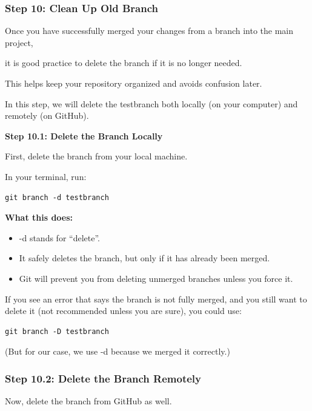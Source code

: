 \documentclass[
  11pt,
  a4paper,
]{article}
\begin{document}
\newpage

\subsubsection{Step 10: Clean Up Old
Branch}\label{step-10-clean-up-old-branch}

Once you have successfully merged your changes from a branch into the
main project,

it is good practice to delete the branch if it is no longer needed.

This helps keep your repository organized and avoids confusion later.

In this step, we will delete the testbranch both locally (on your
computer) and remotely (on GitHub).

\textbf{Step 10.1: Delete the Branch Locally}

First, delete the branch from your local machine.

In your terminal, run:

\begin{verbatim}
git branch -d testbranch
\end{verbatim}

\textbf{What this does:}

\begin{itemize}
\item
  -d stands for ``delete''.
\item
  It safely deletes the branch, but only if it has already been merged.
\item
  Git will prevent you from deleting unmerged branches unless you force
  it.
\end{itemize}

If you see an error that says the branch is not fully merged, and you
still want to delete it (not recommended unless you are sure), you could
use:

\begin{verbatim}
git branch -D testbranch
\end{verbatim}

(But for our case, we use -d because we merged it correctly.)

\subsubsection{Step 10.2: Delete the Branch
Remotely}\label{step-10.2-delete-the-branch-remotely}

Now, delete the branch from GitHub as well.
\end{document}
